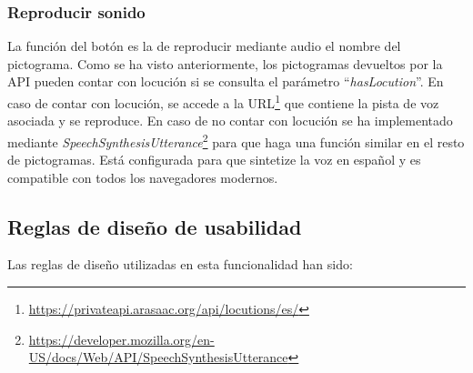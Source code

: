 \subsubsection{Reproducir sonido}


La función del botón es la de reproducir mediante audio el nombre del pictograma. Como se ha visto anteriormente, los pictogramas devueltos por la API pueden contar con locución si se consulta el parámetro “\textit{hasLocution}”. En caso de contar con locución, se accede a la URL\footnote{\url{https://privateapi.arasaac.org/api/locutions/es/}} que contiene la pista de voz asociada y se reproduce. 
En caso de no contar con locución se ha implementado mediante \textit{SpeechSynthesisUtterance}\footnote{\url{https://developer.mozilla.org/en-US/docs/Web/API/SpeechSynthesisUtterance}} para que haga una función similar en el resto de pictogramas. Está configurada para que sintetize la voz en español y es compatible con todos los navegadores modernos.

\subsection{Reglas de diseño de usabilidad}
 Las reglas de diseño utilizadas en esta funcionalidad han sido:

